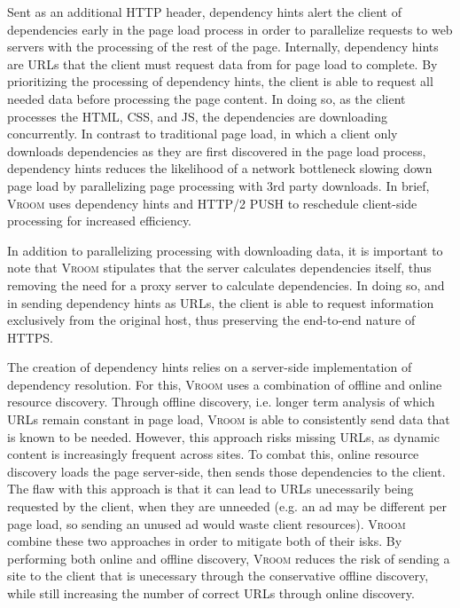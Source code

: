 \documentclass[10pt,letterpaper]{article}
\begin{document}
\begin{multicols*}{2}[]
            Sent as an additional HTTP header, dependency hints alert the client of dependencies early in the page load process in order to parallelize requests to web servers with the processing of the rest of the page. Internally, dependency hints are URLs that the client must request data from for page load to complete. By prioritizing the processing of dependency hints, the client is able to request all needed data before processing the page content. In doing so, as the client processes the HTML, CSS, and JS, the dependencies are downloading concurrently. In contrast to traditional page load, in which a client only downloads dependencies as they are first discovered in the page load process, dependency hints reduces the likelihood of a network bottleneck slowing down page load by parallelizing page processing with 3rd party downloads. In brief, \textsc{Vroom} uses dependency hints and HTTP/2 PUSH to reschedule client-side processing for increased efficiency. 

			In addition to parallelizing processing with downloading data, it is important to note that \textsc{Vroom} stipulates that the server calculates dependencies itself, thus removing the need for a proxy server to calculate dependencies. In doing so, and in sending dependency hints as URLs, the client is able to request information exclusively from the original host, thus preserving the end-to-end nature of HTTPS.

            The creation of dependency hints relies on a server-side implementation of dependency resolution. For this, \textsc{Vroom} uses a combination of offline and online resource discovery. Through offline discovery, i.e. longer term analysis of which URLs remain constant in page load, \textsc{Vroom} is able to consistently send data that is known to be needed. However, this approach risks missing URLs, as dynamic content is increasingly frequent across sites. To combat this, online resource discovery loads the page server-side, then sends those dependencies to the client. The flaw with this approach is that it can lead to URLs unecessarily being requested by the client, when they are unneeded (e.g. an ad may be different per page load, so sending an unused ad would waste client resources). \textsc{Vroom} combine these two approaches in order to mitigate both of their isks. By performing both online and offline discovery, \textsc{Vroom} reduces the risk of sending a site to the client that is unecessary through the conservative offline discovery, while still increasing the number of correct URLs through online discovery.


\end{multicols*}
\end{document}
